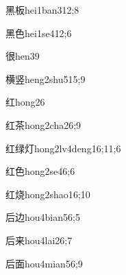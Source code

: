\begin{verbete}{黑板}{hei1ban3}{12;8}
\end{verbete}

\begin{verbete}{黑色}{hei1se4}{12;6}
\end{verbete}

\begin{verbete}{很}{hen3}{9}
\end{verbete}

\begin{verbete}{横竖}{heng2shu5}{15;9}
\end{verbete}

\begin{verbete}{红}{hong2}{6}
\end{verbete}

\begin{verbete}{红茶}{hong2cha2}{6;9}
\end{verbete}

\begin{verbete}{红绿灯}{hong2lv4deng1}{6;11;6}
\end{verbete}

\begin{verbete}{红色}{hong2se4}{6;6}
\end{verbete}

\begin{verbete}{红烧}{hong2shao1}{6;10}
\end{verbete}

\begin{verbete}{后边}{hou4bian5}{6;5}
\end{verbete}

\begin{verbete}{后来}{hou4lai2}{6;7}
\end{verbete}

\begin{verbete}{后面}{hou4mian5}{6;9}
\end{verbete}

